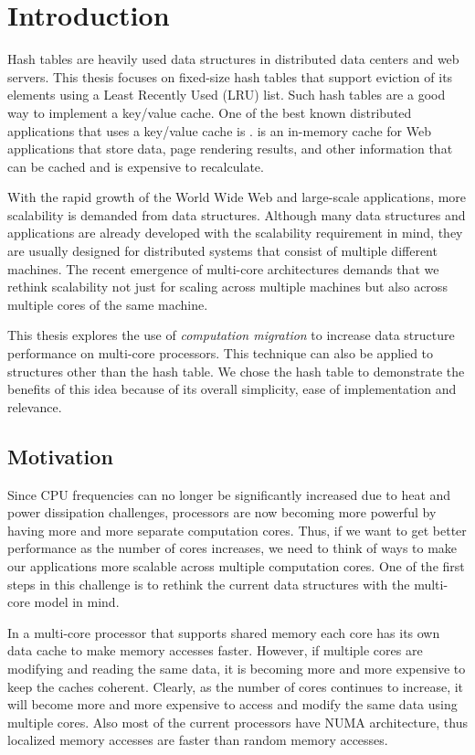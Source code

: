 \chapter{Introduction}
\label{chap:intro}

Hash tables are heavily used data structures in distributed data centers and web servers. This thesis focuses
on fixed-size hash tables that support eviction of its elements using a Least Recently Used (LRU) list. Such hash tables are a good way to
implement a key/value cache. One of the best known distributed applications that uses a key/value cache is 
\memcached{} \cite{memcached}. \memcached{} is an in-memory cache for Web applications that store  
data, page rendering results, and other information that can be cached and is expensive to recalculate.

With the rapid growth of the World Wide Web and large-scale applications, more scalability is demanded from data structures. 
Although many data structures and applications are already developed with the scalability requirement in mind, 
they are usually designed for distributed systems that consist of multiple different machines. The recent emergence of multi-core 
architectures demands that we rethink scalability not just for scaling across multiple machines but also across 
multiple cores of the same machine. 

This thesis explores the use of \textit{computation migration} to increase data structure performance on 
multi-core processors. This technique can also be applied to structures other than the hash table. We chose the 
hash table to demonstrate the benefits of this idea because of its overall simplicity, ease of implementation and relevance.

\section{Motivation}

Since CPU frequencies can no longer be significantly increased due to heat and power dissipation challenges, 
processors are now becoming more powerful by having more and more separate computation cores. Thus, if we want to 
get better performance as the number of cores increases, we need to think of ways to make our applications more scalable across 
multiple computation cores. One of the first steps in this challenge is to rethink the current data structures with 
the multi-core model in mind.  

In a multi-core processor that supports shared memory each core has its own data cache to make memory accesses faster. 
However, if multiple cores are modifying and reading the same data, it is becoming more and more expensive to keep the caches 
coherent. Clearly, as the number of cores continues to increase, it will become more and more expensive to access and modify 
the same data using multiple cores. Also most of the current processors have NUMA architecture, thus localized memory accesses
are faster than random memory accesses.

